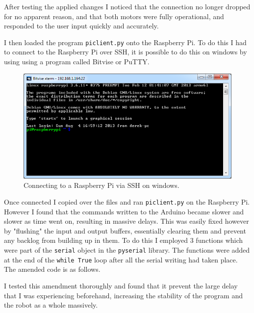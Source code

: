 \documentclass[]{report}   %
\begin{document}
						After testing the applied changes I noticed that the connection no longer dropped for no apparent reason, and that both motors were
						fully operational, and responded to the user input quickly and accurately.
						
						I then loaded the program \lstinline{piclient.py} onto the Raspberry Pi. To do this I had to connect to the Raspberry Pi over SSH, it is
						possible to do this on windows by using using a program called Bitvise or PuTTY.
						
						\begin{figure}[h]
							\caption{Connecting to a Raspberry Pi via SSH on windows.}
							\includegraphics[width=\textwidth,height=\textheight,keepaspectratio]{images/ssh}
						\end{figure}
						
						Once connected I copied over the files and ran \lstinline{piclient.py} on the Raspberry Pi. However I found that the commands written to
						the Arduino became slower and slower as time went on, resulting in massive delays. This was easily fixed however by "flushing" the input
						and output buffers, essentially clearing them and prevent any backlog from building up in them. To do this I employed 3 functions which
						were part of the \lstinline{serial} object in the \lstinline{pyserial} library. The functions were added at the end of the
						\lstinline{while True} loop after all the serial writing had taken place. The amended code is as follows.
						
						
						
						I tested this amendment thoroughly and found that it prevent the large delay that I was experiencing beforehand, increasing the stability
						of the program and the robot as a whole massively.
						
\end{document}
